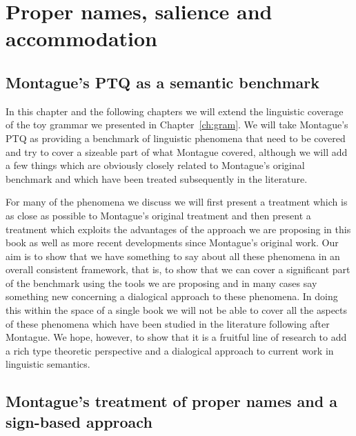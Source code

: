 \chapter{Proper names, salience and accommodation}
\label{ch:propnames}
\setcounter{equation}{0}

\section{Montague's PTQ as a semantic benchmark}

In this chapter and the following chapters we will extend the linguistic coverage of the toy
grammar we presented in Chapter~\ref{ch:gram}.  We will take
Montague's PTQ \citep{Montague1973,Montague1974} as providing a benchmark of linguistic phenomena that
need to be covered and try to cover a sizeable part of what Montague covered, although we will add a few things which are
obviously closely related to Montague's original benchmark and which
have been treated subsequently in the literature.

For many of the phenomena we discuss we will first present a treatment
which is as close as possible to Montague's original treatment and
then present a treatment which exploits the advantages of the approach
we are proposing in this book as well as more recent developments
since Montague's original work.  Our aim is to show that we have
something to say about all these phenomena in an overall consistent
framework, that is, to show that we can cover a significant part of the benchmark using the
tools we are proposing and in many cases say something new concerning
a dialogical approach to these phenomena.  In doing this within the
space of a single book we will not be able to cover all the aspects of
these phenomena which have been studied in the literature following
after Montague.  We hope, however, to show that it is a fruitful line
of research to add a rich type theoretic perspective and a dialogical
approach to current work in linguistic semantics.   
 



\section{Montague's treatment of proper names and a sign-based approach}

